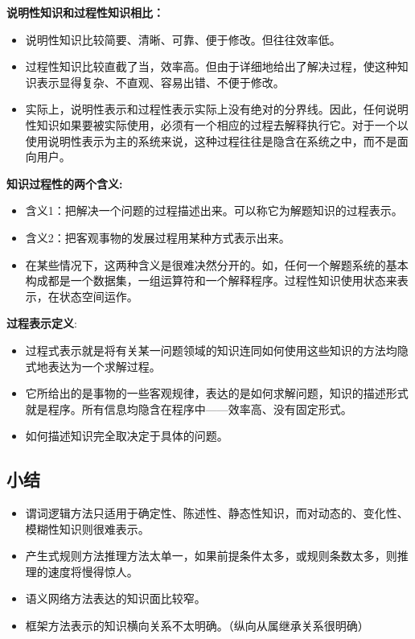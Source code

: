 \documentclass[UTF8,a4paper]{ctexart}
\begin{document}
\textbf{说明性知识和过程性知识相比：}
\begin{itemize}
	\item 说明性知识比较简要、清晰、可靠、便于修改。但往往效率低。
	\item 过程性知识比较直截了当，效率高。但由于详细地给出了解决过程，使这种知识表示显得复杂、不直观、容易出错、不便于修改。
	\item 实际上，说明性表示和过程性表示实际上没有绝对的分界线。因此，任何说明性知识如果要被实际使用，必须有一个相应的过程去解释执行它。对于一个以使用说明性表示为主的系统来说，这种过程往往是隐含在系统之中，而不是面向用户。
\end{itemize}

\textbf{知识过程性的两个含义:}
\begin{itemize}
	\item 含义1：把解决一个问题的过程描述出来。可以称它为解题知识的过程表示。
	\item 含义2：把客观事物的发展过程用某种方式表示出来。
	\item 在某些情况下，这两种含义是很难决然分开的。如，任何一个解题系统的基本构成都是一个数据集，一组运算符和一个解释程序。过程性知识使用状态来表示，在状态空间运作。
\end{itemize}

\textbf{过程表示定义}:
\begin{itemize}
	\item 过程式表示就是将有关某一问题领域的知识连同如何使用这些知识的方法均隐式地表达为一个求解过程。
	\item 它所给出的是事物的一些客观规律，表达的是如何求解问题，知识的描述形式就是程序。所有信息均隐含在程序中——效率高、没有固定形式。
	\item 如何描述知识完全取决定于具体的问题。
\end{itemize}

\subsection{小结}
\begin{itemize}
	\item 谓词逻辑方法只适用于确定性、陈述性、静态性知识，而对动态的、变化性、模糊性知识则很难表示。
	\item 产生式规则方法推理方法太单一，如果前提条件太多，或规则条数太多，则推理的速度将慢得惊人。
	\item 语义网络方法表达的知识面比较窄。
	\item 框架方法表示的知识横向关系不太明确。（纵向从属继承关系很明确）
\end{itemize}
\end{document}
